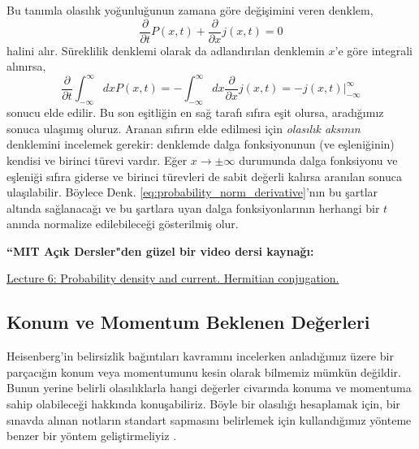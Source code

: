\documentclass[a4paper,12pt, twoside]{article}
\begin{document}
Bu tanımla olasılık yoğunluğunun zamana göre değişimini veren denklem,
\begin{equation}
\dfrac {\partial }{\partial t}P\left( x,t\right) +\dfrac {\partial }{\partial x}j\left( x,t\right) =0
\label{eq:continuity_equation}
\end{equation}
halini alır. Süreklilik denklemi olarak da adlandırılan denklemin $x$'e göre integrali alınırsa,
\begin{equation}
\dfrac {\partial }{\partial t}\int ^{\infty }_{-\infty }dxP\left( x,t\right) =-\int ^{\infty }_{-\infty }dx\dfrac {\partial }{\partial x}j\left( x,t\right) = -j(x,t)\bigg|^{\infty}_{-\infty}
\end{equation}
sonucu elde edilir. Bu son eşitliğin en sağ tarafı sıfıra eşit olursa, aradığımız sonuca ulaşımış oluruz. Aranan sıfırın elde edilmesi için \emph{olasılık aksının} denklemini incelemek gerekir: denklemde dalga fonksiyonunun (ve eşleniğinin) kendisi ve birinci türevi vardır. Eğer $x\rightarrow\pm\infty$ durumunda dalga fonksiyonu ve eşleniği sıfıra giderse ve birinci türevleri de sabit değerli kalırsa aranılan sonuca ulaşılabilir. Böylece Denk. \ref{eq:probability_norm_derivative}'nın bu şartlar altında sağlanacağı ve bu şartlara uyan dalga fonksiyonlarının herhangi bir $t$ anında normalize edilebileceği gösterilmiş olur. 

\vspace{18pt}
{\bf ``MIT Açık Dersler"den güzel bir video dersi kaynağı:}

\href{https://ocw.mit.edu/courses/physics/8-04-quantum-physics-i-spring-2016/video-lectures/part-1/}{Lecture 6: Probability density and current. Hermitian conjugation.}


\subsection{Konum ve Momentum Beklenen Değerleri}

Heisenberg'in belirsizlik bağıntıları kavramını incelerken anladığımız üzere bir parçacığın konum veya momentumunu kesin olarak bilmemiz mümkün değildir. Bunun yerine belirli olasılıklarla hangi değerler civarında konuma ve momentuma sahip olabileceği hakkında konuşabiliriz. Böyle bir olasılığı hesaplamak için, bir sınavda alınan notların standart sapmasını belirlemek için kullandığımız yönteme benzer bir yöntem geliştirmeliyiz \cite{book:Towsend}.
\end{document}

